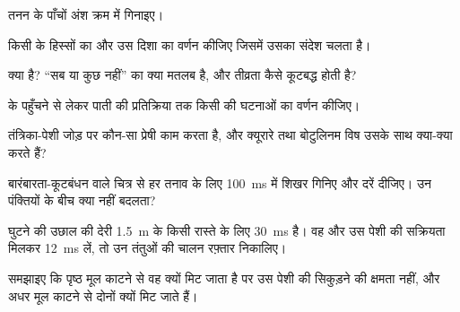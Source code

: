 \begin{exercise}[$\star$]\label{exo:g12:stretch-reflex:1}
तनन  के पाँचों अंश क्रम में गिनाइए।
\end{exercise}

\begin{exercise}[$\star$]\label{exo:g12:stretch-reflex:2}
किसी  के हिस्सों का और उस दिशा का वर्णन कीजिए जिसमें उसका संदेश चलता
है।
\end{exercise}

\begin{exercise}[$\star$]\label{exo:g12:stretch-reflex:3}
 क्या है? ``सब या कुछ नहीं'' का क्या मतलब है, और तीव्रता कैसे
कूटबद्ध होती है?
\end{exercise}

\begin{exercise}[$\star$]\label{exo:g12:stretch-reflex:4}
 के पहुँचने से लेकर पाती  की प्रतिक्रिया तक किसी
 की घटनाओं का वर्णन कीजिए।
\end{exercise}

\begin{exercise}[$\star$]\label{exo:g12:stretch-reflex:5}
तंत्रिका-पेशी जोड़ पर कौन-सा प्रेषी काम करता है, और क्यूरारे तथा बोटुलिनम
विष उसके साथ क्या-क्या करते हैं?
\end{exercise}

\begin{exercise}[$\star\star$]\label{exo:g12:stretch-reflex:6}
बारंबारता-कूटबंधन वाले चित्र से हर तनाव के लिए \qty{100}{ms} में शिखर गिनिए
और दरें दीजिए। उन पंक्तियों के बीच क्या नहीं बदलता?
\end{exercise}

\begin{exercise}[$\star\star$]\label{exo:g12:stretch-reflex:7}
घुटने की उछाल की देरी \qty{1.5}{m} के किसी रास्ते के लिए \qty{30}{ms} है।
वह  और उस पेशी की सक्रियता मिलकर \qty{12}{ms} लें, तो उन तंतुओं
की चालन रफ़्तार निकालिए।
\end{exercise}

\begin{exercise}[$\star\star$]\label{exo:g12:stretch-reflex:8}
समझाइए कि पृष्ठ मूल काटने से वह  क्यों मिट जाता है पर उस पेशी की
सिकुड़ने की क्षमता नहीं, और अधर मूल काटने से दोनों क्यों मिट जाते हैं।
\end{exercise}

